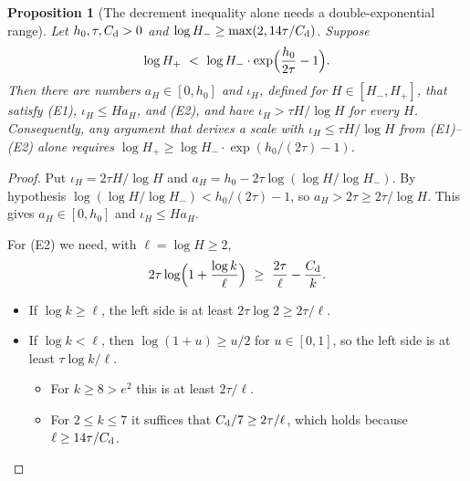 \documentclass[11pt]{amsart}
\newtheorem{proposition}[theorem]{Proposition}
\theoremstyle{definition}
\theoremstyle{remark}
\begin{document}
\begin{proposition}[The decrement inequality alone needs a double-exponential range]\label{prop:decrement-sharp}
Let $h_0,\tau,C_{\rm d}>0$ and $\log H_-\ge\max(2,14\tau/C_{\rm d})$. Suppose
\[
\log H_+\ <\ \log H_-\cdot\exp\Bigl(\frac{h_0}{2\tau}-1\Bigr).
\]
Then there are numbers $a_H\in[0,h_0]$ and $\iota_H$, defined for $H\in[H_-,H_+]$, that satisfy (E1), $\iota_H\le Ha_H$, and (E2), and have $\iota_H>\tau H/\log H$ for \emph{every} $H$. Consequently, any argument that derives a scale with $\iota_H\le\tau H/\log H$ from (E1)--(E2) alone requires $\log H_+\ge\log H_-\cdot\exp(h_0/(2\tau)-1)$.
\end{proposition}
\begin{proof}
Put $\iota_H=2\tau H/\log H$ and $a_H=h_0-2\tau\log(\log H/\log H_-)$. By hypothesis $\log(\log H/\log H_-)<h_0/(2\tau)-1$, so $a_H>2\tau\ge2\tau/\log H$. This gives $a_H\in[0,h_0]$ and $\iota_H\le Ha_H$.

For (E2) we need, with $\ell=\log H\ge2$,
\[
2\tau\log\Bigl(1+\frac{\log k}{\ell}\Bigr)\ \ge\ \frac{2\tau}{\ell}-\frac{C_{\rm d}}k .
\]
\begin{itemize}
\item If $\log k\ge\ell$, the left side is at least $2\tau\log2\ge2\tau/\ell$.
\item If $\log k<\ell$, then $\log(1+u)\ge u/2$ for $u\in[0,1]$, so the left side is at least $\tau\log k/\ell$.
  \begin{itemize}
  \item For $k\ge8>e^2$ this is at least $2\tau/\ell$.
  \item For $2\le k\le7$ it suffices that $C_{\rm d}/7\ge2\tau/\ell$, which holds because $\ell\ge14\tau/C_{\rm d}$.
  \end{itemize}
\end{itemize}
\end{proof}
\end{document}
